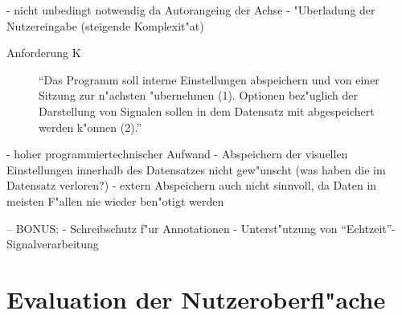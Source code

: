 - nicht unbedingt notwendig da Autorangeing der Achse
- "Uberladung der Nutzereingabe (steigende Komplexit"at)

\begin{description}
	\item[Anforderung K] "`Das Programm soll interne Einstellungen abspeichern und von einer Sitzung zur n"achsten "ubernehmen (1).
					   Optionen bez"uglich der Darstellung von Signalen sollen in dem Datensatz mit abgespeichert werden k"onnen (2)."'
\end{description}

- hoher programmiertechnischer Aufwand
- Abspeichern der visuellen Einstellungen innerhalb des Datensatzes nicht gew"unscht (was haben die im Datensatz verloren?)
- extern Abspeichern auch nicht sinnvoll, da Daten in meisten F"allen nie wieder ben"otigt werden

-- BONUS:
- Schreibschutz f"ur Annotationen
- Unterst"utzung von "`Echtzeit"'-Signalverarbeitung

\section{Evaluation der Nutzeroberfl"ache}






